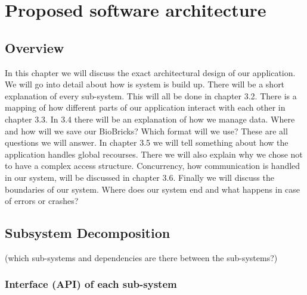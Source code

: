 \documentclass[a4paper]{article}
\begin{document}
\section{Proposed software architecture}
\subsection{Overview}
In this chapter we will discuss the exact architectural design of our application. We will go into detail about how is system is build up. There will be a short explanation of every sub-system. This will all be done in chapter 3.2. There is a mapping of how different parts of our application interact with each other in chapter 3.3. In 3.4 there will be an explanation of how we manage data. Where and how will we save our BioBricks? Which format will we use? These are all questions we will answer. In chapter 3.5 we will tell something about how the application handles global recourses. There we will also explain why we chose not to have a complex access structure. Concurrency, how communication is handled in our system, will be discussed in chapter 3.6. Finally we will discuss the boundaries of our system. Where does our system end and what happens in case of errors or crashes? 
\subsection{Subsystem Decomposition}
(which sub-systems and dependencies are there between the sub-systems?)

\subsubsection{Interface (API) of each sub-system}
\end{document}
